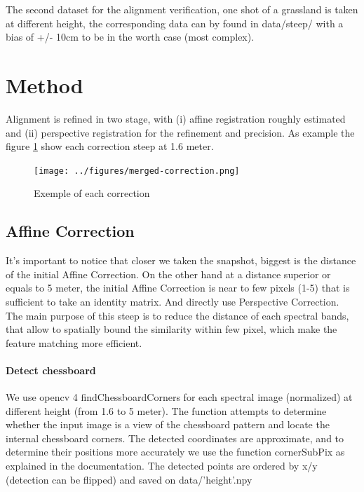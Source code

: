 \documentclass[]{elsarticle}
\begin{document}
			The second dataset for the alignment verification, one shot of a grassland is taken at different height, the corresponding data can by found in data/steep/
			with a bias of +/- 10cm to be in the worth case (most complex).
		
	\newpage
	\section{Method}
		
		Alignment is refined in two stage, with
		(i) affine registration roughly estimated
		and (ii) perspective registration for the refinement and precision.
		As example the figure \ref{fig:merged-correction} show each correction steep at 1.6 meter.
	
		\begin{figure}[!htb]
			\centering
			\texttt{[image: ../figures/merged-correction.png]}
			\caption{Exemple of each correction}
			\label{fig:merged-correction}
		\end{figure}
		
		\subsection{Affine Correction}
		
			It's important to notice that closer we taken the snapshot, biggest is the distance of the initial Affine Correction.
			On the other hand at a distance superior or equals to 5 meter,
			the initial Affine Correction is near to few pixels (1-5) that is sufficient to take an identity matrix.
			And directly use Perspective Correction.
			The main purpose of this steep is to reduce the distance of each spectral bands,
			that allow to spatially bound the similarity within few pixel,
			which make the feature matching more efficient.
		
			\paragraph{Detect chessboard} We use opencv 4 findChessboardCorners for each spectral image (normalized) at different height (from 1.6 to 5 meter).
			The function attempts to determine whether the input image is a view of the chessboard pattern and locate the internal chessboard corners.
			The detected coordinates are approximate, and to determine their positions more accurately we use the function cornerSubPix as explained in the documentation.
			The detected points are ordered by x/y (detection can be flipped) and saved on data/'height'.npy
		
\end{document}

